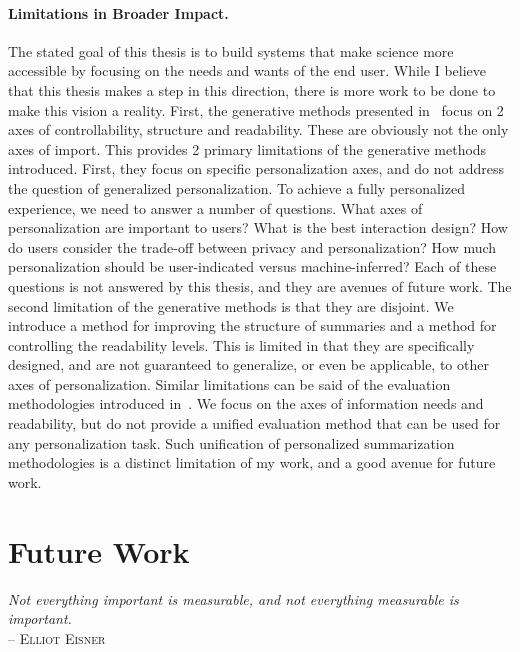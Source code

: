 \paragraph{Limitations in Broader Impact.} The stated goal of this thesis is to build systems that make science more accessible by focusing on the needs and wants of the end user. While I believe that this thesis makes a step in this direction, there is more work to be done to make this vision a reality. First, the generative methods presented in~ focus on 2 axes of controllability, structure and readability. These are obviously not the only axes of import. This provides 2 primary limitations of the generative methods introduced. First, they focus on specific personalization axes, and do not address the question of generalized personalization. To achieve a fully personalized experience, we need to answer a number of questions. What axes of personalization are important to users? What is the best interaction design? How do users consider the trade-off between privacy and personalization? How much personalization should be user-indicated versus machine-inferred? Each of these questions is not answered by this thesis, and they are avenues of future work. The second limitation of the generative methods is that they are disjoint. We introduce a method for improving the structure of summaries and a method for controlling the readability levels. This is limited in that they are specifically designed, and are not guaranteed to generalize, or even be applicable, to other axes of personalization. Similar limitations can be said of the evaluation methodologies introduced in~. We focus on the axes of information needs and readability, but do not provide a unified evaluation method that can be used for any personalization task. Such unification of personalized summarization methodologies is a distinct limitation of my work, and a good avenue for future work.


\section{Future Work}
{
    \small
    \textit{Not everything important is measurable, 
    and not everything measurable is important.} \\
    \textsc{-- Elliot Eisner}
}\\

